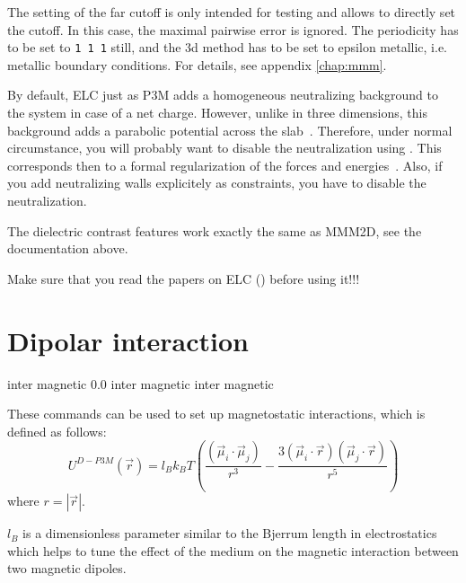 The setting of the far cutoff  is only intended for
testing and allows to directly set the cutoff. In this case, the
maximal pairwise error is ignored. The periodicity has to be set to
\texttt{1 1 1} still, and the 3d method has to be set to epsilon
metallic, i.e.  metallic boundary conditions. For details, see
appendix \vref{chap:mmm}.

By default, ELC just as P3M adds a homogeneous neutralizing background
to the system in case of a net charge. However, unlike in three
dimensions, this background adds a parabolic potential across the
slab~\cite{ballenegger09a}. Therefore, under normal circumstance, you
will probably want to disable the neutralization using
. This corresponds then to a formal
regularization of the forces and energies~\cite{ballenegger09a}. Also,
if you add neutralizing walls explicitely as constraints, you have to
disable the neutralization.

The dielectric contrast features work exactly the same as MMM2D, see
the documentation above.

Make sure that you read the papers on ELC (\cite{arnold02c,
  tyagi08a}) before using it!!!

\section{Dipolar interaction}
\label{sec:inter-dipolar}

\begin{essyntax}
   inter magnetic 0.0
   inter magnetic
   inter magnetic 
\end{essyntax}

These commands can be used to set up magnetostatic interactions, which
is defined as follows:
\begin{equation}
  U^{D-P3M}(\vec{r}) = l_{B} k_B T \left( \frac{(\vec{\mu}_i \cdot \vec{\mu}_j)}{r^3} 
  - \frac{3  (\vec{\mu}_i \cdot \vec{r})  (\vec{\mu}_j \cdot \vec{r}) }{r^5} \right)
\end{equation}
where $r=|\vec{r}|$.

$l_{B}$ is a dimensionless parameter similar to the Bjerrum length in
electrostatics which helps to tune the effect of the medium on the
magnetic interaction between two magnetic dipoles.

